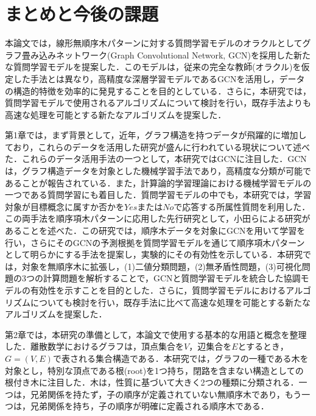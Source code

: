 \section{まとめと今後の課題}
本論文では，線形無順序木パターンに対する質問学習モデルのオラクルとしてグラフ畳み込みネットワーク(Graph Convolutional Network, GCN)を採用した新たな質問学習モデルを提案した．このモデルは，従来の完全な教師(オラクル)を仮定した手法とは異なり，高精度な深層学習モデルであるGCNを活用し，データの構造的特徴を効率的に発見することを目的としている．さらに，本研究では，質問学習モデルで使用されるアルゴリズムについて検討を行い，既存手法よりも高速な処理を可能とする新たなアルゴリズムを提案した．

第1章では，まず背景として，近年，グラフ構造を持つデータが飛躍的に増加しており，これらのデータを活用した研究が盛んに行われている現状について述べた．これらのデータ活用手法の一つとして，本研究ではGCNに注目した．GCNは，グラフ構造データを対象とした機械学習手法であり，高精度な分類が可能であることが報告されている．また，計算論的学習理論における機械学習モデルの一つである質問学習にも着目した．質問学習モデルの中でも，本研究では，学習対象が目標概念に属すか否かを$Yes$または$No$で応答する所属性質問を利用した．この両手法を順序項木パターンに応用した先行研究として，小田ら\cite{oda-ai2022}による研究があることを述べた．この研究では，順序木データを対象にGCNを用いて学習を行い，さらにそのGCNの予測根拠を質問学習モデルを通じて順序項木パターンとして明らかにする手法を提案し，実験的にその有効性を示している．本研究では，対象を無順序木に拡張し，(1)二値分類問題，(2)無矛盾性問題，(3)可視化問題の3つの計算問題を解析することで，GCNと質問学習モデルを統合した協調モデルの有効性を示すことを目的とした．さらに，質問学習モデルにおけるアルゴリズムについても検討を行い，既存手法に比べて高速な処理を可能とする新たなアルゴリズムを提案した．

第2章では，本研究の準備として，本論文で使用する基本的な用語と概念を整理した．離散数学におけるグラフは，頂点集合を$V$，辺集合を$E$とするとき，$G=(V,E)$で表される集合構造である．本研究では，グラフの一種である木を対象とし，特別な頂点である根(root)を1つ持ち，閉路を含まない構造としての根付き木に注目した．木は，性質に基づいて大きく2つの種類に分類される．一つは，兄弟関係を持たず，子の順序が定義されていない無順序木であり，もう一つは，兄弟関係を持ち，子の順序が明確に定義される順序木である．

